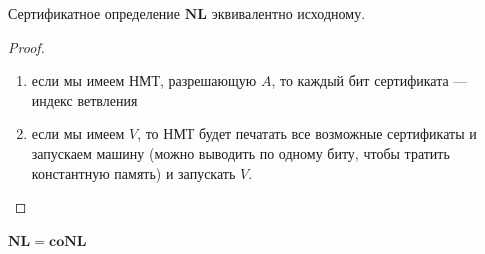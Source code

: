 \begin{proposition}
    Сертификатное определение \(\mathbf{NL}\) эквивалентно исходному.
\end{proposition}
\begin{proof}
    \begin{enumerate}
        \item[\(\Ra\)] если мы имеем НМТ, разрешающую \(A\), то каждый бит сертификата --- индекс ветвления
        \item[\(\La\)] если мы имеем \(V\), то НМТ будет печатать все возможные сертификаты и запускаем машину (можно выводить по одному биту, чтобы тратить константную память) и запускать \(V\).
    \end{enumerate}
\end{proof}

\begin{theorem}
    \(\mathbf{NL} = \mathbf{coNL}\)
\end{theorem}
